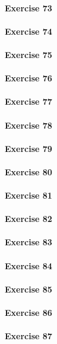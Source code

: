 \paragraph{Exercise 73}
\paragraph{Exercise 74}
\paragraph{Exercise 75}
\paragraph{Exercise 76}
\paragraph{Exercise 77}
\paragraph{Exercise 78}
\paragraph{Exercise 79}
\paragraph{Exercise 80}
\paragraph{Exercise 81}
\paragraph{Exercise 82}
\paragraph{Exercise 83}
\paragraph{Exercise 84}
\paragraph{Exercise 85}
\paragraph{Exercise 86}
\paragraph{Exercise 87}
